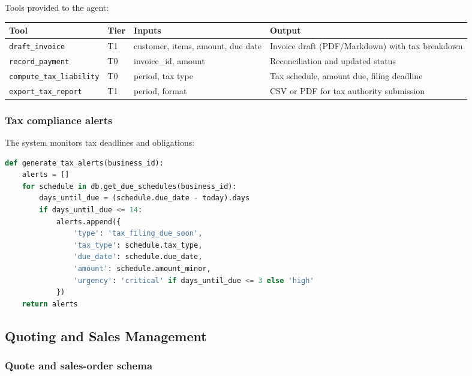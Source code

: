 \documentclass[10pt,a4paper]{article}
\newcommand{\code}[1]{\texttt{\small #1}}
\begin{document}
Tools provided to the agent:

\begin{center}
\begin{tabularx}{\textwidth}{@{}p{4.2cm}p{1.0cm}p{4.2cm}Y@{}}
\toprule
\textbf{Tool} & \textbf{Tier} & \textbf{Inputs} & \textbf{Output}\\
\midrule
\code{draft\_invoice} & T1 & customer, items, amount, due date & Invoice draft (PDF/Markdown) with tax breakdown\\
\code{record\_payment} & T0 & invoice\_id, amount & Reconciliation and updated status\\
\code{compute\_tax\_liability} & T0 & period, tax type & Tax schedule, amount due, filing deadline\\
\code{export\_tax\_report} & T1 & period, format & CSV or PDF for tax authority submission\\
\bottomrule
\end{tabularx}
\end{center}

\subsubsection{Tax compliance alerts}

The system monitors tax deadlines and obligations:

\begin{lstlisting}[language=Python,caption={Tax deadline monitoring}]
def generate_tax_alerts(business_id):
    alerts = []
    for schedule in db.get_due_schedules(business_id):
        days_until_due = (schedule.due_date - today).days
        if days_until_due <= 14:
            alerts.append({
                'type': 'tax_filing_due_soon',
                'tax_type': schedule.tax_type,
                'due_date': schedule.due_date,
                'amount': schedule.amount_minor,
                'urgency': 'critical' if days_until_due <= 3 else 'high'
            })
    return alerts
\end{lstlisting}

\subsection{Quoting and Sales Management}

\subsubsection{Quote and sales-order schema}
\end{document}
